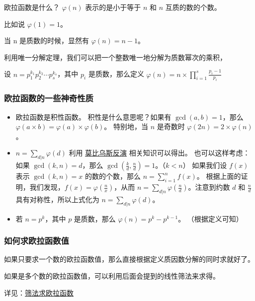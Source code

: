 
欧拉函数是什么？ $\varphi(n)$ 表示的是小于等于 $n$ 和 $n$ 互质的数的个数。

比如说 $\varphi(1) = 1$。

当 n 是质数的时候，显然有 $\varphi(n) = n - 1$。

利用唯一分解定理，我们可以把一个整数唯一地分解为质数幂次的乘积，

设 $n = p_1^{k_1}p_2^{k_2} \cdots p_s^{k_s}$，其中 $p_i$ 是质数，那么定义 $\varphi(n) = n \times \prod_{i = 1}^s{\frac{p_i - 1}{p_i}}$

\subsubsection{欧拉函数的一些神奇性质}

\begin{itemize}
\item 欧拉函数是积性函数。
  积性是什么意思呢？如果有 $\gcd(a, b) = 1$，那么 $\varphi(a \times b) = \varphi(a) \times \varphi(b)$。
  特别地，当 $n$ 是奇数时 $\varphi(2n) = 2 \times \varphi(n)$。
\item $n = \sum_{d | n}{\varphi(d)}$
  利用 \href{/math/mobius/}{莫比乌斯反演} 相关知识可以得出。
  也可以这样考虑：如果 $\gcd(k, n) = d$，那么 $\gcd(\frac{k}{d},\frac{n}{d}) = 1$。（$k < n$）
  如果我们设 $f(x)$ 表示 $\gcd(k, n) = x$ 的数的个数，那么 $n = \sum_{i = 1}^n{f(x)}$。
  根据上面的证明，我们发现，$f(x) = \varphi(\frac{n}{x})$，从而 $n = \sum_{d | n}\varphi(\frac{n}{d})$。注意到约数 $d$ 和 $\frac{n}{d}$ 具有对称性，所以上式化为 $n = \sum_{d | n}\varphi(d)$。
\item 若 $n = p^k$，其中 $p$ 是质数，那么 $\varphi(n) = p^k - p^{k - 1}$。
  （根据定义可知）
\end{itemize}

\subsubsection{如何求欧拉函数值}

如果只要求一个数的欧拉函数值，那么直接根据定义质因数分解的同时求就好了。


如果是多个数的欧拉函数值，可以利用后面会提到的线性筛法来求得。

详见：\href{/math/sieve#_2}{筛法求欧拉函数}
